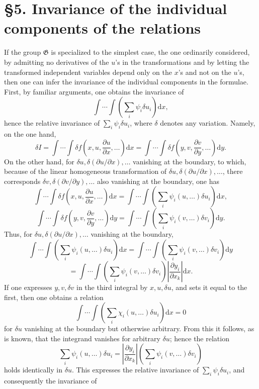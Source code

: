 \documentclass[11pt]{article}
\providecommand{\dd}{\mathrm d}
\providecommand{\G}{\mathfrak G}
\providecommand{\p}{\partial}
\begin{document}
\section*{\S{}5. Invariance of the individual components of the relations}

If the group \(\G\) is specialized to the simplest case, the one ordinarily considered, by admitting no derivatives of the \(u\)'s in the transformations and by letting the transformed independent variables depend only on the \(x\)'s and not on the \(u\)'s, then one can infer the invariance of the individual components in the formulae. First, by familiar arguments, one obtains the invariance of
\[
\int\!\cdots\!\int\left(\sum_i\psi_i\delta u_i\right)\dd x,
\]
hence the relative invariance of \(\sum_i\psi_i\delta u_i\), where \(\delta\) denotes any variation. Namely, on the one hand,
\[
\delta I
=\int\!\cdots\!\int \delta f\!\left(x,u,\frac{\p u}{\p x},\ldots\right)\dd x
=\int\!\cdots\!\int \delta f\!\left(y,v,\frac{\p v}{\p y},\ldots\right)\dd y.
\]
On the other hand, for \(\delta u,\delta(\p u/\p x),\ldots\) vanishing at the boundary, to which, because of the linear homogeneous transformation of \(\delta u,\delta(\p u/\p x),\ldots\), there corresponds \(\delta v,\delta(\p v/\p y),\ldots\) also vanishing at the boundary, one has
\[
\int\!\cdots\!\int \delta f\!\left(x,u,\frac{\p u}{\p x},\ldots\right)\dd x
=
\int\!\cdots\!\int\left(\sum_i\psi_i(u,\ldots)\delta u_i\right)\dd x,
\]
\[
\int\!\cdots\!\int \delta f\!\left(y,v,\frac{\p v}{\p y},\ldots\right)\dd y
=
\int\!\cdots\!\int\left(\sum_i\psi_i(v,\ldots)\delta v_i\right)\dd y.
\]
Thus, for \(\delta u,\delta(\p u/\p x),\ldots\) vanishing at the boundary,
\[
\int\!\cdots\!\int\left(\sum_i\psi_i(u,\ldots)\delta u_i\right)\dd x
=
\int\!\cdots\!\int\left(\sum_i\psi_i(v,\ldots)\delta v_i\right)\dd y
\]
\[
=
\int\!\cdots\!\int\left(\sum_i\psi_i(v,\ldots)\delta v_i\right)
\left|\frac{\p y_i}{\p x_k}\right|\dd x.
\]
If one expresses \(y,v,\delta v\) in the third integral by \(x,u,\delta u\), and sets it equal to the first, then one obtains a relation
\[
\int\!\cdots\!\int\left(\sum_i\chi_i(u,\ldots)\delta u_i\right)\dd x=0
\]
for \(\delta u\) vanishing at the boundary but otherwise arbitrary. From this it follows, as is known, that the integrand vanishes for arbitrary \(\delta u\); hence the relation
\[
\sum_i\psi_i(u,\ldots)\delta u_i
=
\left|\frac{\p y_i}{\p x_k}\right|
\left(\sum_i\psi_i(v,\ldots)\delta v_i\right)
\]
holds identically in \(\delta u\). This expresses the relative invariance of \(\sum_i\psi_i\delta u_i\), and consequently the invariance of
\end{document}
